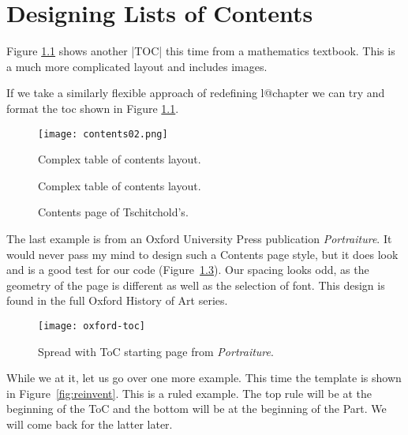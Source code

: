 \chapter{Designing Lists of Contents}

Figure \ref{fig:tocsteward} shows another |TOC| this time from a mathematics textbook. This is a much more complicated layout and includes images.

If we take a similarly flexible approach of redefining l@chapter we can try and format the toc shown in Figure \ref{fig:tocsteward}.

\begin{figure}[tp]
\centering

\texttt{[image: contents02.png]}
\caption{Complex table of contents layout.}
\label{fig:tocsteward}
\end{figure}

\begin{figure}[tp]
\centering
{}
\caption{Complex table of contents layout.}
\label{fig:toc}
\end{figure}
\begin{figure}[htbp]
\bgroup
\parindent=0pt

\hfill{}
\caption{Contents page of Tschitchold's.}

\egroup
\end{figure}
The last example is from an Oxford University Press publication \textit{Portraiture}. It would never pass my mind to design such a Contents page style, but it does look and is a good test for our code  (Figure~\ref{tocsample}). Our spacing looks odd, as the geometry of the page is different as well as the selection of font. This design is found in the full Oxford History of Art series.

\begin{figure}[htbp]
\centering
\texttt{[image: oxford-toc]}
\caption{Spread with ToC starting page from \textit{Portraiture}.}
\label{tocsample}
\end{figure}

While we at it, let us go over one more example. This time the template is shown in Figure~\ref{fig:reinvent}. This is a ruled example. The top rule will be at the beginning of the ToC and the bottom will be at the beginning of the Part. We will come back for the latter later.

